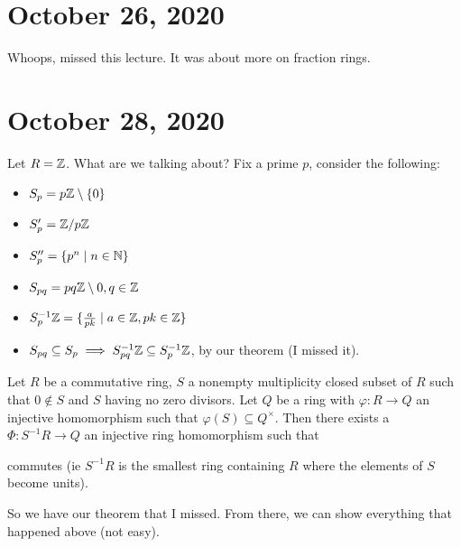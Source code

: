 \section{October 26, 2020}
Whoops, missed this lecture. It was about more on fraction rings.
\section{October 28, 2020}
Let $R=\mathbb{Z}$. What are we talking about? Fix a prime $p$, consider the following:
\begin{itemize}
    \item $S_p = p\mathbb{Z}\setminus \{0\} $ 
    \item $S_p' = \mathbb{Z} /p\mathbb{Z}$
    \item $S_p''=\{p^n   \mid n\in \mathbb{N}\} $ 
    \item $S_{pq}=pq \mathbb{Z} \setminus 0, q\in \mathbb{Z}$
    \item $S_p^{-1}\mathbb{Z}=\{\frac{a}{pk} \mid a\in \mathbb{Z},pk\in \mathbb{Z}\} $ 
    \item $S_{pq}\subseteq S_p \implies S_{pq}^{-1}\mathbb{Z}\subseteq S_p^{-1}\mathbb{Z}$, by our theorem (I missed it).
\end{itemize}
\begin{theorem}
    Let $R$ be a commutative ring, $S$ a nonempty multiplicity closed subset of $R$ such that $0\notin S$ and $S$ having no zero divisors. Let $Q$ be a ring with $\varphi \colon R \to Q$ an injective homomorphism such that $\varphi (S)\subseteq Q^{\times }$. Then there exists a $\Phi \colon S^{-1}R \to Q$ an injective ring homomorphism such that 
                \begin{figure}[H]
                \centering
{}
            \end{figure} commutes (ie $S^{-1}R$ is the smallest ring containing $R$ where the elements of $S$ become units).
\end{theorem}
So we have our theorem that I missed. From there, we can show everything that happened above (not easy).
